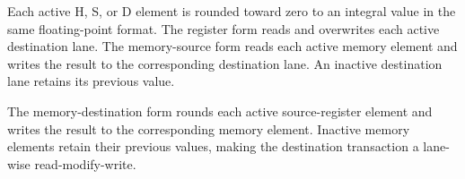Each active H, S, or D element is rounded toward zero to an integral value in
the same floating-point format. The register form reads and overwrites each
active destination lane. The memory-source form reads each active memory element
and writes the result to the corresponding destination lane. An inactive
destination lane retains its previous value.

The memory-destination form rounds each active source-register element and
writes the result to the corresponding memory element. Inactive memory elements
retain their previous values, making the destination transaction a lane-wise
read-modify-write.
